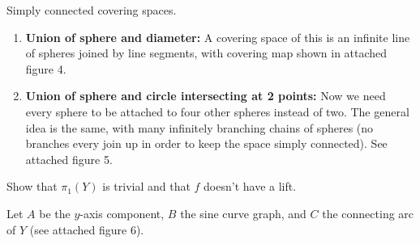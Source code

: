 \documentclass[twoside,10pt]{article}
\begin{document}
\newpage

\begin{exer}[1.3: 4]
Simply connected covering spaces.
\end{exer}

\begin{enumerate}
	\item \textbf{Union of sphere and diameter:} A covering space of this is an infinite line of spheres joined by line segments, with covering map shown in attached figure 4.

	\item \textbf{Union of sphere and circle intersecting at 2 points:} Now we need every sphere to be attached to four other spheres instead of two. The general idea is the same, with many infinitely branching chains of spheres (no branches every join up in order to keep the space simply connected). See attached figure 5.
\end{enumerate}

\newpage

\begin{exer}[1.3: 7]
	Show that $\pi_1(Y)$ is trivial and that $f$ doesn't have a lift.
\end{exer}

Let $A$ be the $y$-axis component, $B$ the sine curve graph, and $C$ the connecting arc of $Y$ (see attached figure 6).
\end{document}
